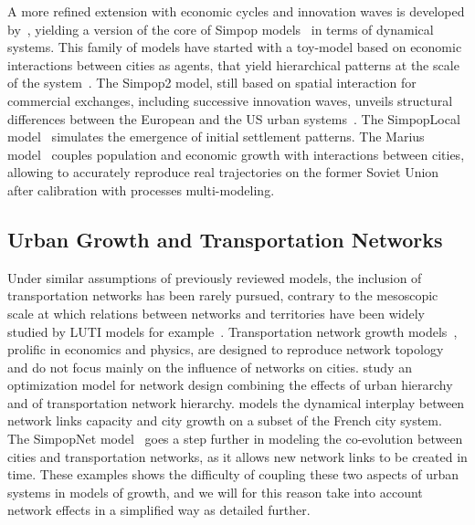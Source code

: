 \documentclass{article}
\begin{document}
A more refined extension with economic cycles and innovation waves is developed by~\cite{favaro2011gibrat}, yielding a version of the core of Simpop models~\citep{pumain2012multi} in terms of dynamical systems. This family of models have started with a toy-model based on economic interactions between cities as agents, that yield hierarchical patterns at the scale of the system~\citep{sanders1997simpop}. The Simpop2 model, still based on spatial interaction for commercial exchanges, including successive innovation waves, unveils structural differences between the European and the US urban systems~\citep{bretagnolle2010comparer}. The SimpopLocal model~\citep{pumain2017simpoplocal} simulates the emergence of initial settlement patterns. The Marius model~\citep{cottineau2014evolution} couples population and economic growth with interactions between cities, allowing to accurately reproduce real trajectories on the former Soviet Union after calibration with processes multi-modeling.


\subsection*{Urban Growth and Transportation Networks}


Under similar assumptions of previously reviewed models, the inclusion of transportation networks has been rarely pursued, contrary to the mesoscopic scale at which relations between networks and territories have been widely studied by LUTI models for example~\citep{chang2006models}. Transportation network growth models~\citep{xie2009modeling}, prolific in economics and physics, are designed to reproduce network topology and do not focus mainly on the influence of networks on cities. \cite{bigotte2010integrated} study an optimization model for network design combining the effects of urban hierarchy and of transportation network hierarchy. \cite{baptiste1999interactions} models the dynamical interplay between network links capacity and city growth on a subset of the French city system. The SimpopNet model~\citep{schmitt2014modelisation} goes a step further in modeling the co-evolution between cities and transportation networks, as it allows new network links to be created in time. These examples shows the difficulty of coupling these two aspects of urban systems in models of growth, and we will for this reason take into account network effects in a simplified way as detailed further.
\end{document}
